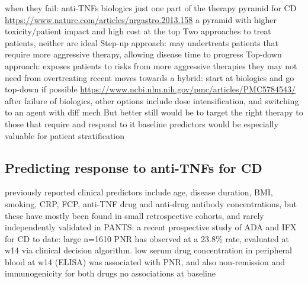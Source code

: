 \begin{outline}
\1 when they fail: anti-TNFs biologics just one part of the therapy pyramid for CD \url{https://www.nature.com/articles/nrgastro.2013.158}
    \2 a pyramid with higher toxicity/patient impact and high cost at the top
    \2 Two approaches to treat patients, neither are ideal
        \3 Step-up approach: may undertreats patients that require more aggressive therapy, allowing disease time to progress
        \3 Top-down approach: exposes patients to risks from more aggressive therapies they may not need from overtreating
        \3 recent moves towards a hybrid: start at biologics and go top-down if possible \url{https://www.ncbi.nlm.nih.gov/pmc/articles/PMC5784543/}
    \2 after failure of biologics, other options include dose intensification, and switching to an agent with diff mech \autocite{lichtenstein2013ComprehensiveReviewAntitumor}
    \2 But better still would be to target the right therapy to those that require and respond to it
    \2 baseline predictors would be especially valuable for patient stratification

\subsection{Predicting response to anti-TNFs for CD}

\1 previously reported clinical predictors include age, disease duration, BMI, smoking, CRP, FCP, anti-TNF drug and anti-drug antibody concentrations, but these have mostly been found in small retrospective cohorts, and rarely independently validated \autocite{dhaens2011LondonPositionStatement,ding2016SystematicReviewPredicting,kopylov2016PredictingDurableResponse,flamant2018InflammatoryBowelDisease,digby-bell2019InterrogatingHostImmunity,noor2020PersonalisedMedicineCrohn}
    \2 in PANTS: a recent prospective study of ADA and IFX for CD to date: large n=1610 \autocite{kennedy2019PredictorsAntiTNFTreatment}
    \2 PNR has observed at a 23.8\% rate, evaluated at w14 via clinical decision algorithm.
    \2 low serum drug concentration in peripheral blood at w14 (ELISA) was associated with PNR, and also non-remission and immunogenicity for both drugs
    \2 no associations at baseline


\end{outline}
